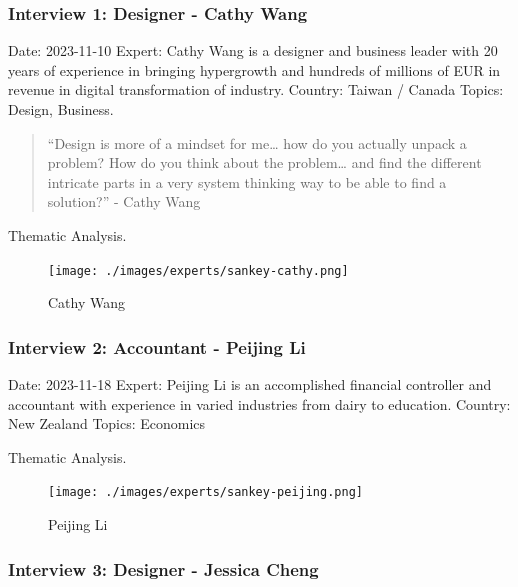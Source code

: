 \documentclass[
  12pt,
  letterpaper,
  DIV=11,
  numbers=noendperiod]{scrartcl}
\begin{document}
\subsubsection{Interview 1: Designer - Cathy
Wang}\label{interview-1-designer---cathy-wang}

Date: 2023-11-10 Expert: Cathy Wang is a designer and business leader
with 20 years of experience in bringing hypergrowth and hundreds of
millions of EUR in revenue in digital transformation of industry.
Country: Taiwan / Canada Topics: Design, Business.

\begin{quote}
``Design is more of a mindset for me\ldots{} how do you actually unpack
a problem? How do you think about the problem\ldots{} and find the
different intricate parts in a very system thinking way to be able to
find a solution?'' - Cathy Wang
\end{quote}

Thematic Analysis.

\begin{figure}[H]

{\centering \texttt{[image: ./images/experts/sankey-cathy.png]}

}

\caption{Cathy Wang}

\end{figure}%

\subsubsection{Interview 2: Accountant - Peijing
Li}\label{interview-2-accountant---peijing-li}

Date: 2023-11-18 Expert: Peijing Li is an accomplished financial
controller and accountant with experience in varied industries from
dairy to education. Country: New Zealand Topics: Economics

Thematic Analysis.

\begin{figure}[H]

{\centering \texttt{[image: ./images/experts/sankey-peijing.png]}

}

\caption{Peijing Li}

\end{figure}%

\subsubsection{Interview 3: Designer - Jessica
Cheng}\label{interview-3-designer---jessica-cheng}
\end{document}
